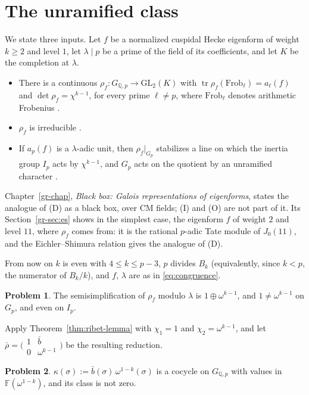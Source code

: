 \documentclass[reqno]{amsart}
\newcounter{chap}
\theoremstyle{definition}
\newtheorem{problem}{Problem}[section]
\theoremstyle{plain}
\newcommand{\Q}{\mathbb{Q}}
\newcommand{\F}{\mathbb{F}}
\newcommand{\Frob}{\mathrm{Frob}}
\newcommand{\tr}{\operatorname{tr}}
\newcommand{\GQ}{G_{\Q,p}}
\newcommand{\mat}[4]{\bigl(\begin{smallmatrix} #1 & #2 \\ #3 & #4 \end{smallmatrix}\bigr)}
\begin{document}
\section{The unramified class}\label{sec:ribet}

We state three inputs.  Let \(f\) be a normalized cuspidal Hecke eigenform of weight \(k\ge2\) and level \(1\), let \(\lambda \mid p\) be a prime of the field of its coefficients, and let \(K\) be the completion at \(\lambda\).
\begin{itemize}
\item[(D)] There is a continuous \(\rho_f \colon \GQ \to \mathrm{GL}_2(K)\) with \(\tr \rho_f(\Frob_\ell) = a_\ell(f)\) and \(\det \rho_f = \chi^{k-1}\), for every prime \(\ell \ne p\), where \(\Frob_\ell\) denotes arithmetic Frobenius \cite{De}.
\item[(I)] \(\rho_f\) is irreducible \cite[\S2]{Ri2}.
\item[(O)] If \(a_p(f)\) is a \(\lambda\)-adic unit, then \(\rho_f|_{G_p}\) stabilizes a line on which the inertia group \(I_p\) acts by \(\chi^{k-1}\), and \(G_p\) acts on the quotient by an unramified character \cite[Thm.~2.1.4]{Wi}.
\end{itemize}
Chapter~\ref{gr-chap}, \emph{Black box: Galois representations of eigenforms}, states the analogue of (D) as a black box, over CM fields; (I) and (O) are not part of it.  Its Section~\ref{gr-sec:es} shows in the simplest case, the eigenform \(f\) of weight \(2\) and level \(11\), where \(\rho_f\) comes from: it is the rational \(p\)-adic Tate module of \(J_0(11)\), and the Eichler--Shimura relation gives the analogue of (D).

From now on \(k\) is even with \(4 \le k \le p - 3\), \(p\) divides \(B_k\) (equivalently, since \(k < p\), the numerator of \(B_k/k\)), and \(f\), \(\lambda\) are as in \eqref{eq:congruence}.

\begin{problem}\label{pr:ss}
The semisimplification of \(\rho_f\) modulo \(\lambda\) is \(1 \oplus \omega^{k-1}\), and \(1 \ne \omega^{k-1}\) on \(G_p\), and even on \(I_p\).
\end{problem}

Apply Theorem~\ref{thm:ribet-lemma} with \(\chi_1 = 1\) and \(\chi_2 = \omega^{k-1}\), and let \(\bar\rho = \mat{1}{\bar b}{0}{\omega^{k-1}}\) be the resulting reduction.

\begin{problem}\label{pr:class}
\(\kappa(\sigma) := \bar b(\sigma)\,\omega^{1-k}(\sigma)\) is a cocycle on \(\GQ\) with values in \(\F(\omega^{1-k})\), and its class is not zero.
\end{problem}
\end{document}
